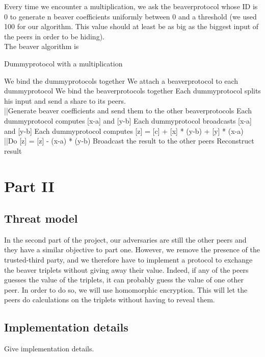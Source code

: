 \documentclass[10pt,conference,compsocconf]{IEEEtran}
\begin{document}
Every time we encounter a multiplication, we ask the beaverprotocol whose ID is 0 to generate n beaver coefficients uniformly between 0 and a threshold (we used 100 for our algorithm. This value should at least be as big as the biggest input of the peers in order to be hiding).\\
The beaver algorithm is 

\begin{algorithm}
	\caption{Dummyprotocol with a multiplication}\label{hard-core bit}
	\begin{algorithmic}[1]
		\State We bind the dummyprotocols together
		\State We attach a beaverprotocol to each dummyprotocol
		\State We bind the beaverprotocols together
		\State Each dummyprotocol splits his input and send a share to its peers.
		\\
		{ ||Generate beaver coefficients and send them to the other beaverprotocols}
		\EndIf
		\State Each dummyprotocol computes [x-a] and [y-b]
		\State Each dummyprotocol broadcasts [x-a] and [y-b]
		\State Each dummyprotocol computes [z] = [c] + [x] * (y-b) + [y] * (x-a)
		\\{ ||Do [z] = [z] - (x-a) * (y-b)}
		\EndIf
		\State Broadcast the result to the other peers
		\State Reconstruct result
	\end{algorithmic}
\end{algorithm}

\section{Part II}
\subsection{Threat model}
In the second part of the project, our adversaries are still the other peers and they have a similar objective to part one. However, we remove the presence of the trusted-third party, and we therefore have to implement a protocol to exchange the beaver triplets without giving away their value. Indeed, if any of the peers guesses the value of the triplets, it can probably guess the value of one other peer. In order to do so, we will use homomorphic encryption. This will let the peers do calculations on the triplets without having to reveal them.\\

\subsection{Implementation details}
Give implementation details.
\end{document}

